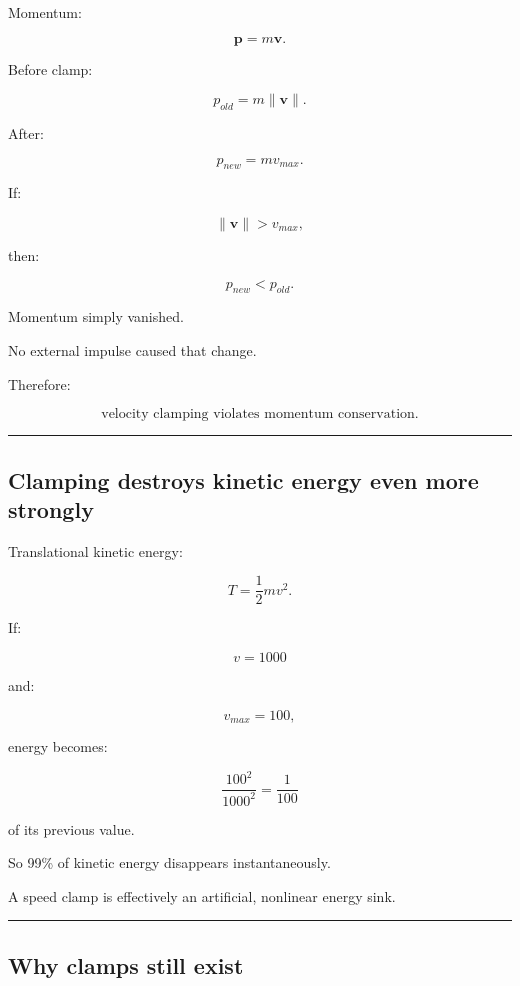 Momentum:

\[
\mathbf p=m\mathbf v.
\]

Before clamp:

\[
p_{old}=m\|\mathbf v\|.
\]

After:

\[
p_{new}=mv_{max}.
\]

If:

\[
\|\mathbf v\|>v_{max},
\]

then:

\[
p_{new}<p_{old}.
\]

Momentum simply vanished.

No external impulse caused that change.

Therefore:

\[
\boxed{
\text{velocity clamping violates momentum conservation.}
}
\]

\begin{center}\rule{0.5\linewidth}{0.5pt}\end{center}

\subsection{Clamping destroys kinetic energy even more strongly}\label{06-engine-ii-ch038-clamping-destroys-kinetic-energy-even-more-strongly}

Translational kinetic energy:

\[
T=
\frac12mv^2.
\]

If:

\[
v=1000
\]

and:

\[
v_{max}=100,
\]

energy becomes:

\[
\frac{100^2}{1000^2}
=
\frac1{100}
\]

of its previous value.

So 99\% of kinetic energy disappears instantaneously.

A speed clamp is effectively an artificial, nonlinear energy sink.

\begin{center}\rule{0.5\linewidth}{0.5pt}\end{center}

\subsection{Why clamps still exist}\label{06-engine-ii-ch038-why-clamps-still-exist}

